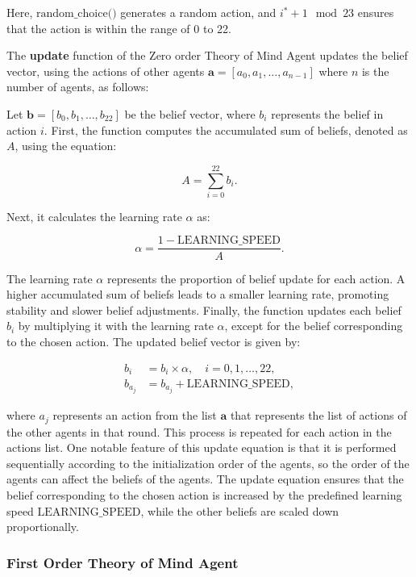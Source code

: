 Here, $\text{{random\_choice()}}$ generates a random action, and $i^* + 1 \mod 23$ ensures that the action is within the range of 0 to 22.

The \textbf{update} function of the Zero order Theory of Mind Agent updates the belief vector, using the actions of other agents $\mathbf{a} = [a_0, a_1, \ldots, a_{n-1}]$ where $n$ is the number of agents, as follows: 

\label{eq:zero-order-update}
Let $\mathbf{b} = [b_0, b_1, \ldots, b_{22}]$ be the belief vector, where $b_i$ represents the belief in action $i$. First, the function computes the accumulated sum of beliefs, denoted as $A$, using the equation:

\[
A = \sum_{i=0}^{22} b_i.
\]

Next, it calculates the learning rate $\alpha$ as:

\[
\alpha = \frac{{1 - \text{{LEARNING\_SPEED}}}}{{A}}.
\]

The learning rate $\alpha$ represents the proportion of belief update for each action. A higher accumulated sum of beliefs leads to a smaller learning rate, promoting stability and slower belief adjustments. Finally, the function updates each belief $b_i$ by multiplying it with the learning rate $\alpha$, except for the belief corresponding to the chosen action. The updated belief vector is given by:

\[
\begin{aligned}
b_i & = b_i \times \alpha, \quad i = 0, 1, \ldots, 22, \quad\\
b_{a_{j}} & = b_{a_{j}} + \text{{LEARNING\_SPEED}},
\end{aligned}
\]

where $a_j$ represents an action from the list $\mathbf{a}$ that represents the list of actions of the other agents in that round. This process is repeated for each action in the actions list. One notable feature of this update equation is that it is performed sequentially according to the initialization order of the agents, so the order of the agents can affect the beliefs of the agents. The update equation ensures that the belief corresponding to the chosen action is increased by the predefined learning speed $\text{{LEARNING\_SPEED}}$, while the other beliefs are scaled down proportionally.

\subsubsection{First Order Theory of Mind Agent}

